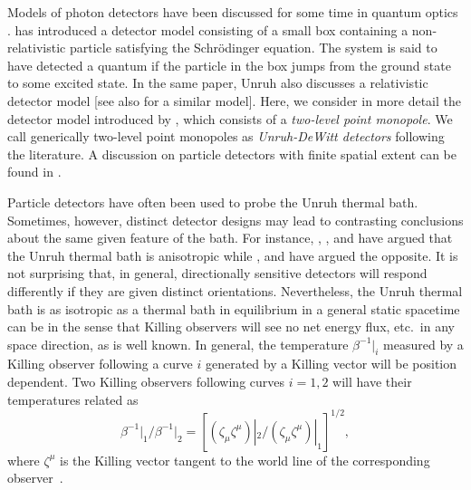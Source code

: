 \documentclass[12pt,nofootinbib,floatfix,aps,prd,showpacs,amsmath,amssymb,eqsecnum]{revtex4-2}
\begin{document}
Models of photon detectors have been discussed 
for some time in
quantum optics \cite{Glauber63}. \textcite{Unruh76} has introduced
a detector model consisting of a small box containing
a non-relativistic particle satisfying the Schr\"odinger equation. 
The system is said to have detected a quantum
if the particle 
in the box jumps from the ground state to some excited state.
In the same paper, Unruh also discusses a relativistic detector model
[see also \textcite{Sanchez81} for a similar model]. Here, we 
consider in more detail the detector model introduced by 
\textcite{DeWitt79}, which consists of a {\em two-level point 
monopole}.  
We call generically
two-level point monopoles as {\em Unruh-DeWitt detectors}
following the literature.  
A discussion 
on particle detectors with finite spatial extent can be found in 
\textcite{Groveetal83}.

Particle detectors have 
often been used to probe the Unruh 
thermal bath. Sometimes, however, distinct detector designs may 
lead to contrasting conclusions about the same given feature of the bath. 
For instance, \textcite{Israeletal83}, \textcite{Sanchez85},
\textcite{Hintonetal83} and \textcite{Hinton83} 
have argued that the Unruh thermal bath is anisotropic while 
\textcite{Kolbenstvedt87}, \textcite{Gerlach83} and 
\textcite{Groveetal85} have argued the opposite. 
It is not surprising that, in general, directionally sensitive detectors 
will respond differently 
if they are given distinct orientations. Nevertheless,
the Unruh thermal bath is as isotropic as a thermal bath in equilibrium 
in a general static spacetime can be in the sense 
that Killing observers will see 
no net energy flux, etc.~in 
any space direction, as is well known. In general, the temperature
$\beta^{-1}|_i$ measured by a Killing observer following a curve $i$
generated by a Killing vector 
will be position dependent. Two Killing observers 
following curves $i=1,2$ will have their temperatures related as 
$$
{\beta^{-1}|_1}/{\beta^{-1}|_2} =  
[(\zeta_{\mu} \zeta^{\mu})|_2/(\zeta_{\mu} \zeta^{\mu})|_1]^{1/2},
$$
where
$\zeta^{\mu}$  is the Killing vector tangent to the world line of
the corresponding observer~\cite{Tolman}.
\end{document}
